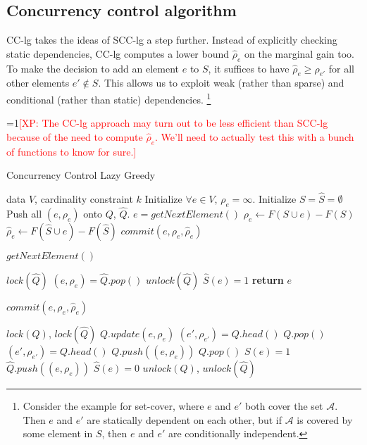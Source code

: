 \documentclass{article}
\newcommand{\Comments}{1}
\newcommand{\note}[2]{\ifnum\Comments=1\textcolor{#1}{#2}\fi}
\newcommand{\xinghao}[1]{\note{red}{[XP: #1]}}
\newcommand{\scclz}{SCC-lg}
\newcommand{\cclz}{CC-lg}
\begin{document}
\subsection{Concurrency control algorithm}
\cclz{} takes the ideas of \scclz{} a step further.
Instead of explicitly checking static dependencies, \cclz{} computes a lower bound $\widehat\rho_e$ on the marginal gain too.
To make the decision to add an element $e$ to $S$, it suffices to have $\widehat\rho_e \geq \rho_{e'}$ for all other elements $e' \not\in S$.
This allows us to exploit weak (rather than sparse) and conditional (rather than static) dependencies.
\footnote{
Consider the example for set-cover, where $e$ and $e'$ both cover the set $\mathcal{A}$.
Then $e$ and $e'$ are statically dependent on each other, but if $\mathcal{A}$ is covered by some element in $S$, then $e$ and $e'$ are conditionally independent.
}

\xinghao{The \cclz{} approach may turn out to be less efficient than \scclz{} because of the need to compute $\widehat\rho_e$.
We'll need to actually test this with a bunch of functions to know for sure.}
\begin{algorithm}[tb]
  \caption{Concurrency Control Lazy Greedy}
  \label{alg:cclz}
\begin{algorithmic}[1]
   data $V$, cardinality constraint $k$
  \STATE Initialize $\forall e \in V$, $\rho_e = \infty$.
  \STATE Initialize $S = \widehat{S} = \emptyset$
  \STATE Push all $(e, \rho_e)$ onto $Q$, $\widehat{Q}$.
    \STATE $e = getNextElement()$
    \STATE $\rho_e     \leftarrow F(S\cup e) - F(S)$
    \STATE $\widehat\rho_e \leftarrow F(\widehat{S}\cup e) - F(\widehat{S})$
    \STATE $commit(e, \rho_e, \widehat\rho_e)$
  \ENDFOR
\end{algorithmic}
\end{algorithm}


\begin{algorithm}[tb]
  \caption{$getNextElement()$}
  \label{alg:cclz:getnext}
\begin{algorithmic}
  \STATE $lock(\widehat{Q})$
  \STATE $(e, \rho_e) = \widehat{Q}.pop()$
  \STATE $unlock(\widehat{Q})$
  \STATE $\widehat{S}(e) = 1$
  \STATE \textbf{return} $e$
\end{algorithmic}
\end{algorithm}


\begin{algorithm}[tb]
  \caption{$commit(e, \rho_e, \widehat\rho_e)$}
  \label{alg:cclz:commit}
\begin{algorithmic}
  \STATE $lock(Q)$, $lock(\widehat{Q})$
  \STATE $Q.update(e, \rho_e)$
  \STATE $(e', \rho_{e'}) = Q.head()$
    \STATE $Q.pop()$
    \STATE $(e', \rho_{e'}) = Q.head()$
    \STATE $Q.push((e, \rho_e))$
  \ENDIF
    \STATE $Q.pop()$
    \STATE $S(e) = 1$
  \ELSE
    \STATE $\widehat{Q}.push((e, \rho_e))$
    \STATE $\widehat{S}(e) = 0$
  \ENDIF
  \STATE $unlock(Q)$, $unlock(\widehat{Q})$
\end{algorithmic}
\end{algorithm}
\end{document}
